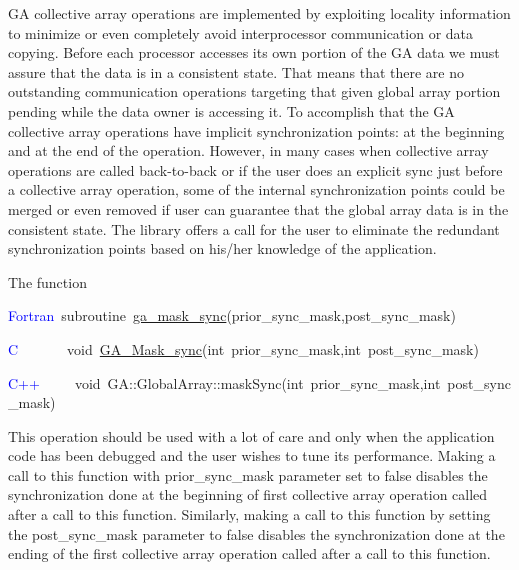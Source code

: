 GA collective array operations are implemented by exploiting locality
information to minimize or even completely avoid interprocessor communication
or data copying. Before each processor accesses its own portion of
the GA data we must assure that the data is in a consistent state.
That means that there are no outstanding communication operations
targeting that given global array portion pending while the data owner
is accessing it. To accomplish that the GA collective array operations
have implicit synchronization points: at the beginning and at the
end of the operation. However, in many cases when collective array
operations are called back-to-back or if the user does an explicit
sync just before a collective array operation, some of the internal
synchronization points could be merged or even removed if user can
guarantee that the global array data is in the consistent state. The
library offers a call for the user to eliminate the redundant synchronization
points based on his/her knowledge of the application.

The function

\textcolor{blue}{Fortran}~subroutine~\href{https://hpc.pnl.gov/globalarrays/api/f_op_api.html\#ga_mask_sync}{ga\_{}mask\_{}sync}(prior\_sync\_mask,post\_sync\_mask)

\textcolor{blue}{C}~~~~~~~void~\href{https://hpc.pnl.gov/globalarrays/api/c_op_api.html\#ga_mask_sync}{GA\_{}Mask\_{}sync}(int~prior\_sync\_mask,int~post\_sync\_mask)

\textcolor{blue}{C++}~~~~~void~GA::GlobalArray::maskSync(int~prior\_sync\_mask,int~post\_sync\_mask)

This operation should be used with a lot of care and only when the
application code has been debugged and the user wishes to tune its
performance. Making a call to this function with prior\_sync\_mask
parameter set to false disables the synchronization done at the beginning
of first collective array operation called after a call to this function.
Similarly, making a call to this function by setting the post\_sync\_mask
parameter to false disables the synchronization done at the ending
of the first collective array operation called after a call to this
function.
